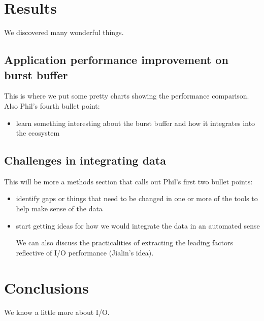 \documentclass[conference,10pt,compsocconf]{IEEEtran}
\begin{document}
\section{Results}

We discovered many wonderful things.

\subsection{Application performance improvement on burst buffer}

This is where we put some pretty charts showing the performance comparison.
Also Phil's fourth bullet point:

\begin{itemize}
\item learn something interesting about the burst buffer and how it integrates
into the ecosystem
\end{itemize}

\subsection{Challenges in integrating data}

This will be more a methods section that calls out Phil's first two bullet points:

\begin{itemize}
\item identify gaps or things that need to be changed in one or more of the tools
to help make sense of the data
\item start getting ideas for how we would integrate the data in an automated
sense

We can also discuss the practicalities of extracting the leading factors
reflective of I/O performance (Jialin's idea).
\end{itemize}


\section{Conclusions}

We know a little more about I/O.



\end{document}
